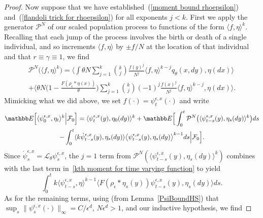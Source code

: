 \documentclass[EJP]{ejpecp} %
\newcommand{\IE}{\mathbb E}
\newcommand{\Pgen}{\mathcal{P}}    %
\begin{document}
\begin{proof}
Now suppose that we have established~(\ref{moment bound rhoepsilon}) 
and~(\ref{flandoli trick for rhoepsilon}) for all exponents $j<k$.
First we apply the generator $\Pgen^N$ of our scaled population process
to functions of the form $\langle f,\eta\rangle^k$.
Recalling that each jump of the process involves the birth or death of a single 
individual, and so increments $\langle f,\eta\rangle$ by $\pm f/N$ at the location of
that individual and that $r \equiv \gamma \equiv 1$, we find 
\begin{multline}
\label{pgen applied to kth moment}
\Pgen^N\Big(\langle f,\eta\rangle^k\Big)
=
\Big\langle
\int\theta N
    \sum_{j=1}^k \binom{k}{j} \frac{f(y)^j}{N^j} \langle f, \eta\rangle^{k-j}
    q_\theta(x,dy),\eta(dx)\Big\rangle
\\
+
    \Big\langle\theta N\Big(1-\frac{F(\rho_\epsilon*\eta(x))}{\theta}\Big)
    \sum_{j=1}^k \binom{k}{j} (-1)^j \frac{f(x)^j}{N^j} \langle f, \eta\rangle^{k-j}
    ,\eta(dx)\Big\rangle.
\end{multline}
Mimicking what we did above, we set $f(\cdot)=\psi^{\epsilon,x}_t(\cdot)$ and 
write
\begin{multline}
\label{kth moment for time varying function}
\IE\Big[\langle \psi^{\epsilon,x}_0,\eta_t\rangle^k\Big|{\cal F}_0\Big]
=\langle\psi^{\epsilon, x}_t(y),\eta_0(dy)\rangle^k
+\IE\Big[\int_0^t\Pgen^N\big(\langle\psi^{\epsilon,x}_{t-s}(y),\eta_s(dy)\rangle^k\big) ds
\\
-\int_0^t\langle k\dot{\psi}^{\epsilon,x}_{t-s}(y), \eta_s(dy)\rangle
\big\langle \psi^{\epsilon, x}_{t-s}(y),\eta_s(dy)\big\rangle^{k-1}ds
\Big|{\cal F}_0\Big].
\end{multline}
Since $\dot \psi^{\epsilon,x}_s = \mathcal{L}_\theta \psi^{\epsilon,x}_s$,
the $j=1$ term from $\Pgen^N(\langle \psi^{\epsilon,x}_{t-s}(y),\eta_s(dy) \rangle^k)$
combines with the last term in~\eqref{kth moment for time varying function}
to yield 
$$ \int_0^t k \langle \psi^{\epsilon,x}_{t-s},\eta\rangle^{k-1} \langle F(\rho_\epsilon*\eta_s(y)) \psi^{\epsilon,x}_{t-s}(y), \eta_s(dy) \rangle ds . $$
As for the remaining terms, using (from Lemma~\ref{PsiBoundHS}) 
that $\sup_s\|\psi^{\epsilon,x}_s(\cdot)\|_\infty=C/\epsilon^d$,
$N\epsilon^d>1$,
and our inductive
hypothesis, we find

\end{proof}
\end{document}
